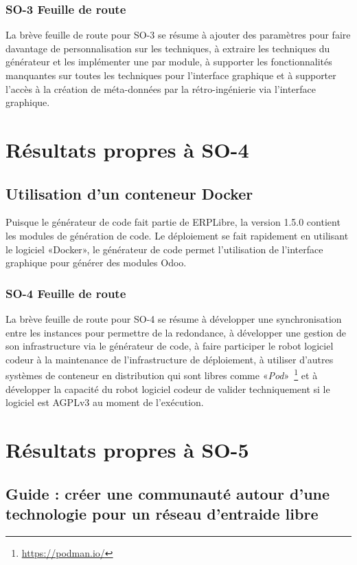 \subsubsection{SO-3 Feuille de route}
La brève feuille de route pour SO-3 se résume à ajouter des paramètres pour faire davantage de personnalisation sur les techniques, à extraire les techniques du générateur et les implémenter une par module, à supporter les fonctionnalités manquantes sur toutes les techniques pour l’interface graphique et à supporter l’accès à la création de méta-données par la rétro-ingénierie via l’interface graphique.

\section{Résultats propres à SO-4}

\subsection{Utilisation d’un conteneur Docker}

Puisque le générateur de code fait partie de ERPLibre, la version 1.5.0 contient les modules de génération de code. Le déploiement se fait rapidement en utilisant le logiciel «Docker», le générateur de code permet l’utilisation de l’interface graphique pour générer des modules Odoo.

\subsubsection{SO-4 Feuille de route}
La brève feuille de route pour SO-4 se résume à développer une synchronisation entre les instances pour permettre de la redondance, à développer une gestion de son infrastructure via le générateur de code, à faire participer le robot logiciel codeur à la maintenance de l’infrastructure de déploiement, à utiliser d’autres systèmes de conteneur en distribution qui sont libres comme «\textit{Pod}»~\footnote{\url{https://podman.io/}} et à développer la capacité du robot logiciel codeur de valider techniquement si le logiciel est AGPLv3 au moment de l’exécution.

\section{Résultats propres à SO-5}

\subsection{Guide : créer une communauté autour d’une technologie pour un réseau d’entraide libre}

